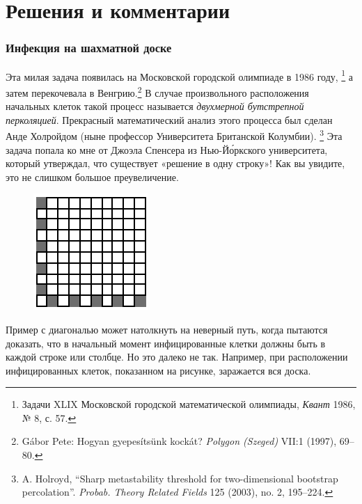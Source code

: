 \section*{Решения и комментарии}

\subsubsection*{Инфекция на шахматной доске}%

{\sloppy

Эта милая задача появилась на Московской городской олимпиаде в 1986 году,%
\footnote{Задачи XLIX Московской городской математической олимпиады, \emph{Квант} 1986, № 8, с. 57.}
а затем перекочевала в Венгрию.\footnote{Gábor Pete: Hogyan gyepesítsünk kockát? \emph{Polygon (Szeged)} VII:1 (1997), 69--80.}
В случае произвольного расположения начальных клеток такой процесс называется \emph{двухмерной бутстрепной перколяцией}.
Прекрасный математический анализ этого процесса был сделан Анде Холройдом (ныне профессор Университета Британской Колумбии).%
\footnote{A. Holroyd, ``Sharp metastability threshold for two-dimensional bootstrap percolation''. \emph{Probab. Theory Related Fields} 125 (2003), no. 2, 195--224.}
Эта задача попала ко мне от Джоэла Спенсера %
из Нью-Й\'{о}ркского университета, который утверждал, что существует «решение в одну строку»!
Как вы увидите, это не слишком большое преувеличение.

}

{

\begin{figure}
\vskip-8mm
\centering
\includegraphics[scale=1.5]{Figs/Algorithms/sick}
\end{figure}

\medskip

Пример с диагональю может натолкнуть на неверный путь, когда пытаются доказать, что в начальный момент инфицированные клетки должны быть в каждой строке или столбце.
Но это далеко не так.
Например, при расположении инфицированных клеток, показанном на рисунке, заражается вся доска.

}

